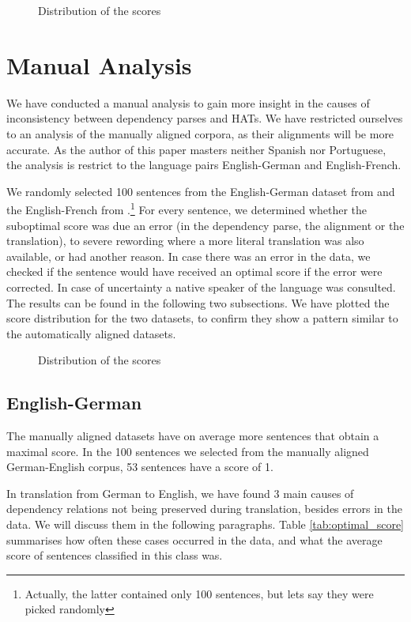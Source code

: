 \begin{figure}[!ht]

\caption{Distribution of the scores}\label{fig:scoredstrib}
\end{figure}

\section{Manual Analysis}
\label{sec:man}

We have conducted a manual analysis to gain more insight in the causes of inconsistency between dependency parses and HATs. We have restricted ourselves to an analysis of the manually aligned corpora, as their alignments will be more accurate. As the author of this paper masters neither Spanish nor Portuguese, the analysis is restrict to the language pairs English-German and English-French.

We randomly selected 100 sentences from the English-German dataset from \cite{pado2006optimal} and the English-French from \cite{graca2008building}.\footnote{Actually, the latter contained only 100 sentences, but lets say they were picked randomly} For every sentence, we determined whether the suboptimal score was due an error (in the dependency parse, the alignment or the translation), to severe rewording where a more literal translation was also available, or had another reason. In case there was an error in the data, we checked if the sentence would have received an optimal score if the error were corrected. In case of uncertainty a native speaker of the language was consulted. The results can be found in the following two subsections. We have plotted the score distribution for the two datasets, to confirm they show a pattern similar to the automatically aligned datasets.

\begin{figure}[!ht]

\caption{Distribution of the scores}\label{fig:scoredstrib2}
\end{figure}

\subsection{English-German}

The manually aligned datasets have on average more sentences that obtain  a maximal score. In the 100 sentences we selected from the manually aligned German-English corpus, 53 sentences have a score of 1.

In translation from German to English, we have found 3 main causes of dependency relations not being preserved during translation, besides errors in the data. We will discuss them in the following paragraphs. Table \ref{tab:optimal_score} summarises how often these cases occurred in the data, and what the average score of sentences classified in this class was.

